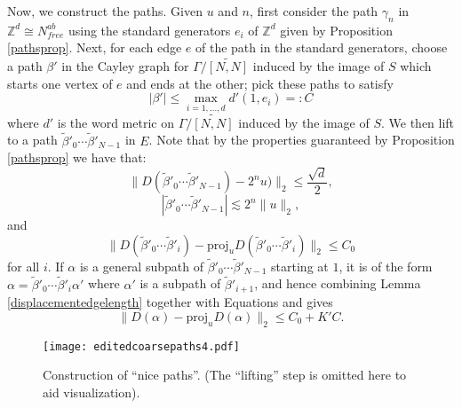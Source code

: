 \documentclass[12pt,reqno]{article}
\makeatletter
\let\reftagform@=\tagform@
\def\tagform@#1{\maketag@@@{(\ignorespaces\textcolor{purple}{#1}\unskip\@@italiccorr)}}
\renewcommand{\eqref}[1]{\textup{\reftagform@{\ref{#1}}}}
\numberwithin{equation}{section}
\newcommand{\Z}{\mathbb{Z}}
\newcommand{\proj}{\mathrm{proj}}
\makeatother
\begin{document}
Now, we construct the paths.
Given $u$ and $n$, first consider the path $\gamma_n$ in $\Z^d \cong N^{ab}_{free}$ using the standard generators $e_i$ of $\Z^d$
given by Proposition \ref{pathsprop}. Next, for each edge $e$ of the path in the standard generators, choose a path $\beta'$ in the Cayley graph for 
$\Gamma/\widetilde{[N,N]}$ induced by the image of $S$ which starts one vertex of $e$ and ends at the other; pick these paths to satisfy
\begin{equation} \label{eq:segmentbound}
   |\beta'| \le \max_{i=1,...,d} d'(1,e_i) =: C
\end{equation}
where $d'$ is the word metric on $\Gamma/\widetilde{[N,N]}$ induced by the image of $S$.
We then lift to a path $\tilde{\beta}'_0 \cdots \tilde{\beta}'_{N-1}$ in $E$. Note that by the properties guaranteed by Proposition \ref{pathsprop} 
we have that: 
\begin{equation} \label{eq:hitstarget}
   \| D(\tilde{\beta}'_0 \cdots \tilde{\beta}'_{N-1}) - 2^n u) \|_2 \le \frac{\sqrt{d}}{2},
\end{equation}
\begin{equation} \label{eq:nottoolong}
   |\tilde{\beta}'_0 \cdots \tilde{\beta}'_{N-1}| \lesssim 2^n \|u\|_2,
\end{equation}
and
\begin{equation} \label{eq:nearparallel}
   \| D(\tilde{\beta}'_0 \cdots \tilde{\beta}'_i) - \proj_u D(\tilde{\beta}'_0 \cdots \tilde{\beta}'_i) \|_2 \le C_0
\end{equation}
for all $i$. If $\alpha$ is a general subpath of $\tilde{\beta}'_0 \cdots \tilde{\beta}'_{N-1}$ starting at $1$, it is of the form 
$\alpha = \tilde{\beta}'_0 \cdots \tilde{\beta}'_i \alpha'$ where $\alpha'$ is a subpath of $\tilde{\beta}'_{i+1}$, and hence
combining Lemma \ref{displacementedgelength} together with Equations \eqref{eq:segmentbound} and \eqref{eq:nearparallel} gives
\begin{equation} \label{eq:stillnearparallel}
   \| D(\alpha) - \proj_u D(\alpha) \|_2 \le C_0 + K' C.
\end{equation}


\begin{figure}[t]
   \centering
   \texttt{[image: editedcoarsepaths4.pdf]}
   \caption{Construction of ``nice paths''. (The ``lifting'' step is omitted here to aid visualization). }
\end{figure}
\end{document}
